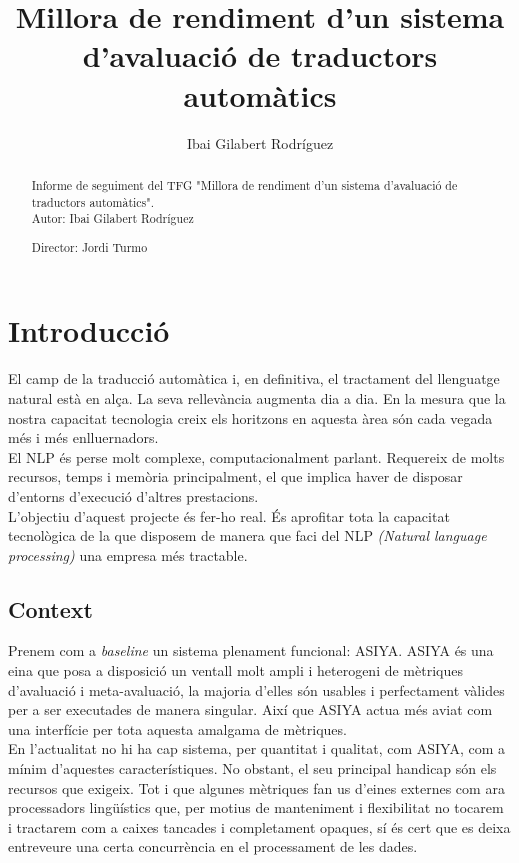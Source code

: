 \documentclass[11pt,a4paper]{article}
\begin{document}
\title{Millora de rendiment d'un sistema d'avaluació de traductors automàtics}
\author{Ibai Gilabert Rodríguez}
\maketitle
\newpage

\begin{abstract}
Informe de seguiment del TFG "Millora de rendiment d'un sistema d'avaluació de traductors automàtics".
\\

Autor: Ibai Gilabert Rodríguez

Director: Jordi Turmo
\end{abstract}
\newpage

\tableofcontents
\newpage

\section{Introducció}

El camp de la traducció automàtica i, en definitiva, el tractament del llenguatge natural està en alça. La seva rellevància augmenta dia a dia. En la mesura que la nostra capacitat tecnologia creix els horitzons en aquesta àrea són cada vegada més i més enlluernadors.
\\

El NLP és perse molt complexe, computacionalment parlant. Requereix de molts recursos, temps i memòria principalment, el que implica haver de disposar d'entorns d'execució d'altres prestacions.
\\

L'objectiu d'aquest projecte és fer-ho real. És aprofitar tota la capacitat tecnològica de la que disposem de manera que faci del NLP \textit{(Natural language processing)} una empresa més tractable.

\subsection{Context}
Prenem com a \textit{baseline} un sistema plenament funcional: ASIYA\cite{asiya}. ASIYA és una eina que posa a disposició un ventall molt ampli i heterogeni de mètriques d'avaluació i meta-avaluació, la majoria d'elles són usables i perfectament vàlides per a ser executades de manera singular. Així que ASIYA actua més aviat com una interfície per tota aquesta amalgama de mètriques.
\\

En l'actualitat no hi ha cap sistema, per quantitat i qualitat, com ASIYA, com a mínim d'aquestes característiques. No obstant, el seu principal handicap són els recursos que exigeix. Tot i que algunes mètriques fan us d'eines externes com ara processadors lingüístics que, per motius de manteniment i flexibilitat no tocarem i tractarem com a caixes tancades i completament opaques, sí és cert que es deixa entreveure una certa concurrència en el processament de les dades. 
\\
\end{document}
